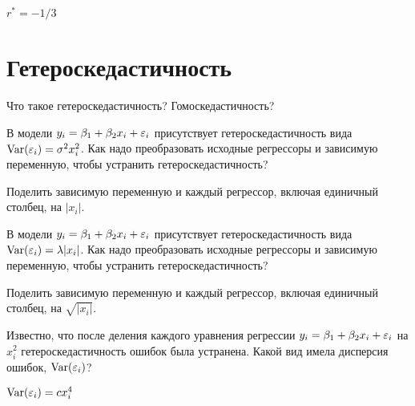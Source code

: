 \documentclass[pdftex,11pt,openany]{book}\usepackage[]{graphicx}\usepackage[]{color}
\begin{document}
\begin{solution}
$r^* = -1/3$
\end{solution}








\chapter{Гетероскедастичность}


\begin{problem}
Что такое гетероскедастичность? Гомоскедастичность?
\end{problem}
\begin{solution}
\end{solution}

\begin{problem}
В модели $y_i = \beta_1 + \beta_2 x_i + \varepsilon_i$ присутствует гетероскедастичность вида $\operatorname{Var}(\varepsilon_i)=\sigma^2 x^2_i$. Как надо преобразовать исходные регрессоры и зависимую переменную, чтобы устранить гетероскедастичность? 
\end{problem}

\begin{solution}
Поделить зависимую переменную и каждый регрессор, включая единичный столбец, на $|x_i|$.
\end{solution}


\begin{problem}
В модели $y_i = \beta_1 + \beta_2 x_i + \varepsilon_i$ присутствует гетероскедастичность вида $\operatorname{Var}(\varepsilon_i)=\lambda |x_i|$. Как надо преобразовать исходные регрессоры и зависимую переменную, чтобы устранить гетероскедастичность? 
\end{problem}

\begin{solution}
Поделить зависимую переменную и каждый регрессор, включая единичный столбец, на $\sqrt{|x_i|}$.
\end{solution}


\begin{problem}
Известно, что после деления каждого уравнения регрессии $y_i = \beta_1 + \beta_2 x_i + \varepsilon_i$ на $x_i^2$ гетероскедастичность ошибок была устранена. Какой вид имела дисперсия ошибок, $\operatorname{Var}(\varepsilon_i)$?
\end{problem}

\begin{solution}
$\operatorname{Var}(\varepsilon_i)=cx_i^4$
\end{solution}
\end{document}
